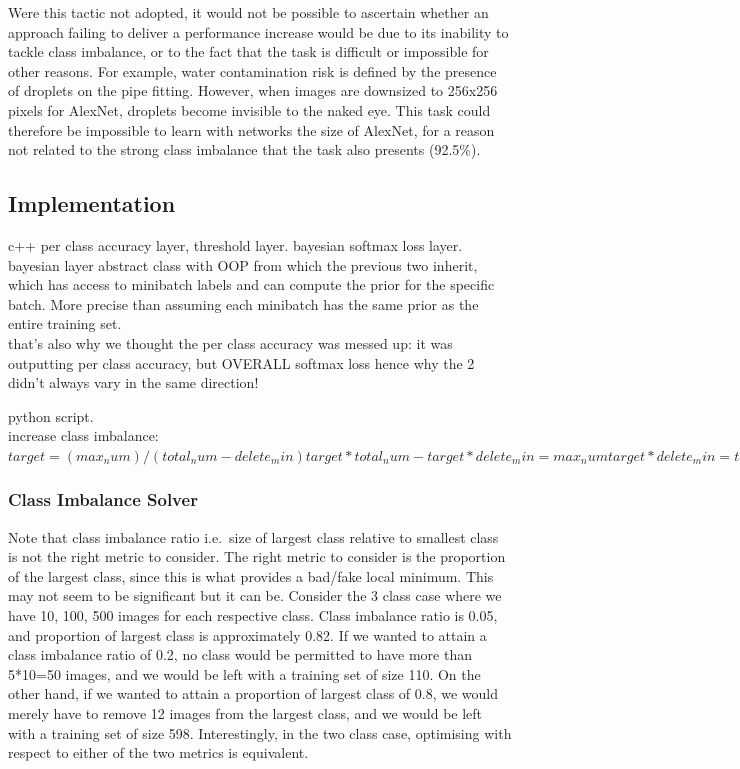 \documentclass[a4paper,11pt]{article}
\begin{document}
Were this tactic not adopted, it would not be possible to ascertain whether an approach failing to deliver a performance increase would be due to its inability to tackle class imbalance, or to the fact that the task is difficult or impossible for other reasons. For example, water contamination risk is defined by the presence of droplets on the pipe fitting. However, when images are downsized to 256x256 pixels for AlexNet, droplets become invisible to the naked eye. This task could therefore be impossible to learn with networks the size of AlexNet, for a reason not related to the strong class imbalance that the task also presents (92.5\%). \\

\subsection{Implementation}

c++ per class accuracy layer, threshold layer. bayesian softmax loss layer. bayesian layer abstract class with OOP from which the previous two inherit, which has access to minibatch labels and can compute the prior for the specific batch. More precise than assuming each minibatch has the same prior as the entire training set. \\

that's also why we thought the per class accuracy was messed up: it was outputting per class accuracy, but OVERALL softmax loss
hence why the 2 didn't always vary in the same direction!

python script. \\

increase class imbalance:
$target = (max_num) / (total_num - delete_min)
target*total_num - target*delete_min = max_num
target*delete_min = target*total_num - max_num
delete_min = total_num - (max_num/target)$

\subsubsection{Class Imbalance Solver}

Note that class imbalance ratio i.e.\ size of largest class relative to smallest class is not the right metric to consider. The right metric to consider is the proportion of the largest class, since this is what provides a bad/fake local minimum. This may not seem to be significant but it can be. Consider the 3 class case where we have 10, 100, 500 images for each respective class. Class imbalance ratio is 0.05, and proportion of largest class is approximately 0.82. If we wanted to attain a class imbalance ratio of 0.2, no class would be permitted to have more than 5*10=50 images, and we would be left with a training set of size 110. On the other hand, if we wanted to attain a proportion of largest class of 0.8, we would merely have to remove 12 images from the largest class, and we would be left with a training set of size 598. Interestingly, in the two class case, optimising with respect to either of the two metrics is equivalent. \\
\end{document}
